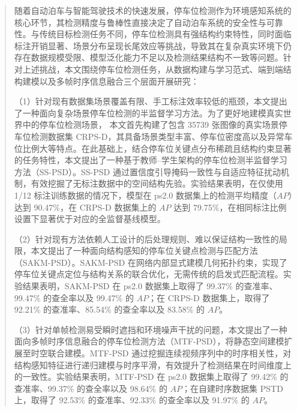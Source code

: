 \setlength{\baselineskip}{20pt}
\begin{abstract}
随着自动泊车与智能驾驶技术的快速发展，停车位检测作为环境感知系统的核心环节，其检测精度与鲁棒性直接决定了自动泊车系统的安全性与可靠性。与传统目标检测任务不同，停车位检测具有强结构约束特性，同时面临标注开销显著、场景分布呈现长尾效应等挑战，导致其在复杂真实环境下仍存在数据规模受限、模型泛化能力不足以及检测结果结构不一致等问题。针对上述挑战，本文围绕停车位检测任务，从数据构建与学习范式、端到端结构建模以及多帧时序信息融合三个层面开展研究：

（1）针对现有数据集场景覆盖有限、手工标注效率较低的瓶颈，本文提出了一种面向复杂场景停车位检测的半监督学习方法。为了更好地建模真实世界中的停车位检测场景，
本文首先构建了包含 35739 张图像的真实场景停车位检测数据集 CRPS-D，其具备场景类型丰富、停车位密度高以及异常车位比例大等特点。在此基础上，结合停车位关键点分布稀疏且结构约束显著的任务特性，本文提出了一种基于教师–学生架构的停车位检测半监督学习方法（SS-PSD）。SS-PSD 通过置信度引导掩码一致性与自适应特征扰动机制，有效挖掘了无标注数据中的空间结构先验。实验结果表明，在仅使用 1/12 标注训练数据的情况下，模型在 ps2.0 数据集上的检测平均精度（$AP$）达到 90.47\%，在 CRPS-D 数据集上的 $AP$ 达到 79.75\%，在相同标注比例设置下显著优于对应的全监督基线模型。

（2）针对现有方法依赖人工设计的后处理规则、难以保证结构一致性的局限，本文提出了一种面向结构感知的停车位关键点检测与匹配方法（SAKM-PSD）。SAKM-PSD 在网络内部显式建模几何拓扑约束，实现了停车位关键点定位与结构关系的联合优化，无需传统的启发式匹配流程。实验结果表明，SAKM-PSD 在 ps2.0 数据集上取得了 99.37\% 的查准率、99.47\% 的查全率以及 99.47\% 的 $AP$；在 CRPS-D 数据集上，取得了 92.21\% 的查准率、85.54\% 的查全率以及 83.58\% 的 $AP$。

（3）针对单帧检测易受瞬时遮挡和环境噪声干扰的问题，本文提出了一种面向多帧时序信息融合的停车位检测方法（MTF-PSD），将静态空间建模扩展至时空联合建模。MTF-PSD 通过挖掘连续视频序列中的时序相关性，对结构感知特征进行递归建模与时序平滑，有效提升了检测结果在时间维度上的一致性。实验结果表明，MTF-PSD 在 ps2.0 数据集上取得了 99.42\% 的查准率、99.37\% 的查全率以及 98.64\% 的 $AP$；在自建时序数据集 PSTD 上，取得了 92.53\% 的查准率、92.33\% 的查全率以及 91.97\% 的 $AP$。


	\noindent{}
\end{abstract}